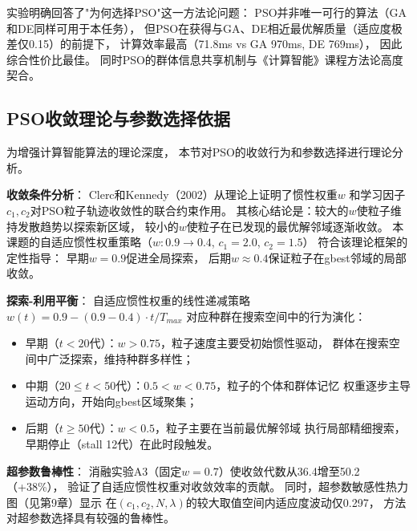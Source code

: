 实验明确回答了"为何选择PSO"这一方法论问题：
PSO并非唯一可行的算法（GA和DE同样可用于本任务），
但PSO在获得与GA、DE相近最优解质量（适应度极差仅0.15）的前提下，
计算效率最高（71.8ms vs GA 970ms, DE 769ms），
因此综合性价比最佳。
同时PSO的群体信息共享机制与《计算智能》课程方法论高度契合。

\subsection{PSO收敛理论与参数选择依据}

为增强计算智能算法的理论深度，
本节对PSO的收敛行为和参数选择进行理论分析。

\textbf{收敛条件分析}：
Clerc和Kennedy（2002）从理论上证明了惯性权重$w$
和学习因子$c_1, c_2$对PSO粒子轨迹收敛性的联合约束作用。
其核心结论是：较大的$w$使粒子维持发散趋势以探索新区域，
较小的$w$使粒子在已发现的最优解邻域逐渐收敛。
本课题的自适应惯性权重策略（$w:0.9\to0.4$, $c_1=2.0$, $c_2=1.5$）
符合该理论框架的定性指导：
早期$w=0.9$促进全局探索，
后期$w\approx0.4$保证粒子在gbest邻域的局部收敛。

\textbf{探索-利用平衡}：
自适应惯性权重的线性递减策略$w(t)=0.9-(0.9-0.4)\cdot t/T_{max}$
对应种群在搜索空间中的行为演化：
\begin{itemize}
    \item 早期（$t<20$代）：$w>0.75$，粒子速度主要受初始惯性驱动，
        群体在搜索空间中广泛探索，维持种群多样性；
    \item 中期（$20\leq t<50$代）：$0.5<w<0.75$，粒子的个体和群体记忆
        权重逐步主导运动方向，开始向gbest区域聚集；
    \item 后期（$t\geq 50$代）：$w<0.5$，粒子主要在当前最优解邻域
        执行局部精细搜索，早期停止（stall 12代）在此时段触发。
\end{itemize}

\textbf{超参数鲁棒性}：
消融实验A3（固定$w=0.7$）使收敛代数从36.4增至50.2（+38\%），
验证了自适应惯性权重对收敛效率的贡献。
同时，超参数敏感性热力图（见第9章）显示
在$(c_1, c_2, N, \lambda)$的较大取值空间内适应度波动仅0.297，
方法对超参数选择具有较强的鲁棒性。
